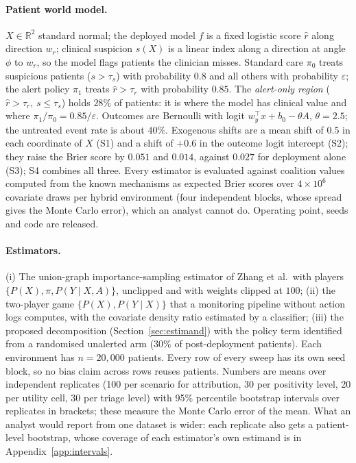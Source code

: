 \documentclass[letterpaper]{article} %
\newcommand{\rhat}{\hat r}
\begin{document}
\paragraph{Patient world model.} $X \in \mathbb{R}^2$ standard normal; the
deployed model $f$ is a fixed logistic score $\rhat$ along direction $w_r$;
clinical suspicion $s(X)$ is a linear index along a direction at angle $\phi$
to $w_r$, so the model flags patients the clinician misses. Standard care
$\pi_0$ treats suspicious patients ($s > \tau_s$) with probability $0.8$ and all
others with probability $\varepsilon$; the alert policy $\pi_1$ treats
$\rhat > \tau_r$ with probability $0.85$. The \emph{alert-only region}
($\rhat > \tau_r$, $s \le \tau_s$) holds $28\%$ of patients: it is where the
model has clinical value and where $\pi_1 / \pi_0 = 0.85 / \varepsilon$. Outcomes
are Bernoulli with logit $w_y^\top x + b_0 - \theta A$, $\theta = 2.5$; the
untreated event rate is about $40\%$. Exogenous shifts are a mean shift of $0.5$
in each coordinate of $X$ (S1) and a shift of $+0.6$ in the outcome logit
intercept (S2); they raise the Brier score by $0.051$ and $0.014$, against
$0.027$ for deployment alone (S3); S4 combines all three. Every estimator is
evaluated against coalition values computed from the known mechanisms as
expected Brier scores over $4 \times 10^6$ covariate draws per hybrid
environment (four independent blocks, whose spread gives the Monte Carlo
error), which an analyst cannot do. Operating point, seeds and code are
released.

\paragraph{Estimators.} (i) The union-graph importance-sampling estimator of
Zhang et al.\ with players $\{P(X), \pi, P(Y \mid X, A)\}$, unclipped and with
weights clipped at $100$; (ii) the two-player game $\{P(X), P(Y \mid X)\}$ that a
monitoring pipeline without action logs computes, with the covariate density
ratio estimated by a classifier; (iii) the proposed decomposition
(Section~\ref{sec:estimand}) with the policy term identified from a randomised
unalerted arm ($30\%$ of post-deployment patients). Each environment has
$n = 20{,}000$ patients. Every row of every sweep has its own seed block,
so no bias claim across rows reuses patients. Numbers are means over
independent replicates (100 per scenario for attribution, 30 per positivity
level, 20 per utility cell, 30 per triage level) with 95\% percentile bootstrap
intervals over replicates in brackets; these measure the Monte Carlo error of
the mean. What an analyst would report from one dataset is wider: each
replicate also gets a patient-level bootstrap, whose coverage of each
estimator's own estimand is in Appendix~\ref{app:intervals}.
\end{document}
